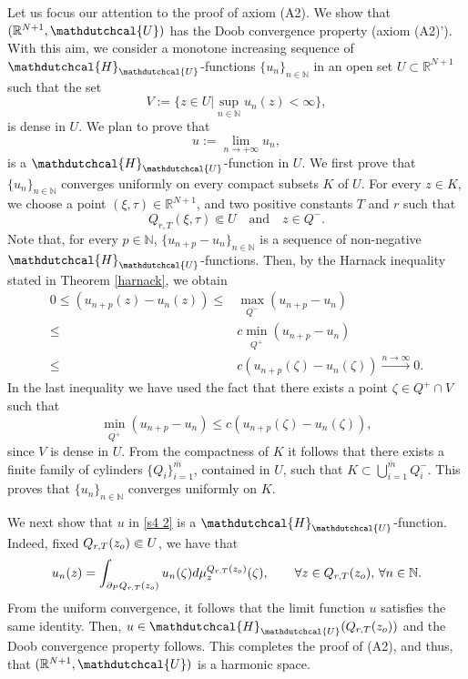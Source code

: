 \documentclass{amsart}
\numberwithin{equation}{section}
\def \R {{\mathbb {R}}}
\def \r{{\mathbb{R}}}
\def \Hd{{\mathdutchcal{H}}}
\def \Ud{{\mathdutchcal{U}}}
\begin{document}
{Let us focus our attention to the proof of  axiom {\rm (A2)}. We show that $(\r^{N+1},\Ud)$ has the Doob convergence property (axiom {\rm (A2)'}). With this aim, we consider a monotone increasing sequence of $\Hd_{\Ud}$-functions $\{u_n\}_{n \in \mathbb{N}}$ in an open set $U \subset \r^{N+1}$ such that the set
$$
V :=\biggl\{z \in U | \sup_{n \in \mathbb{N}}u_n(z) <\infty \biggr\},
$$
is dense in $U$. We plan to prove that 
\begin{equation}
	\label{s4 2}
u:= \lim_{n \rightarrow +\infty} u_n,
\end{equation}
is a $\Hd_{\Ud}$-function in $U$. We first prove that $\{u_n\}_{n \in \mathbb{N}}$ converges uniformly on every compact subsets $K$ of $U$. For every $z \in K$, we choose a point $(\xi, \tau) \in \R^{N+1}$, and two positive constants $T$ and $r$ such that
$$
{Q}_{r,T}(\xi, \tau) \Subset U \quad \mbox{and} \quad z \in Q^-.
$$
Note that, for every $p \in \mathbb{N}$, $\{u_{n+p}-u_n\}_{n \in \mathbb{N}}$ is a sequence of non-negative $\Hd_{\Ud}$-functions. Then, by the Harnack inequality stated in Theorem \ref{harnack}, we obtain
\begin{align*}
	0 \leq (u_{n+p}(z)-u_n(z)) \leq & \max_{\overline{Q^-}} (u_{n+p}-u_n)\\
	\leq & c \min_{\overline{Q^+}}(u_{n+p}-u_n)\\
	\leq & c (u_{n+p}(\zeta)-u_n(\zeta)) \xrightarrow{n \rightarrow \infty}0.
\end{align*}
In the last inequality we have used the fact that there exists a point $\zeta \in Q^+ \cap V$ such that 
$$
\min_{\overline{Q^+}}(u_{n+p}-u_n)
\leq  c (u_{n+p}(\zeta)-u_n(\zeta)),
$$ 
since $V$ is dense in $U$. From the compactness of $K$ it follows that there exists a finite family of cylinders $\{Q_i\}_{i=1}^{\bar{m}}$,  contained in $U$, such that $K \subset \bigcup_{i=1}^{\bar{m}} Q^-_i$. This proves that $\{u_n\}_{n \in \mathbb{N}}$ converges uniformly on $K$. 
 
We next show that $u$ in \eqref{s4 2} is a $\Hd_{\Ud}$-function. Indeed, fixed ${Q}_{r,T}(z_{\rm o}) \Subset U$, we have that 
\begin{equation*}
	u_n(z) = \int_{\partial_P {Q}_{r,T}(z_{\rm o})} u_n(\zeta) {\rm d}\mu^{{Q}_{r,T}(z_{\rm o})}_z(\zeta), \qquad \forall z \in {Q}_{r,T}(z_{\rm o}), \, \forall n \in \mathbb{N}.
\end{equation*}
From the uniform convergence, it follows that the limit function $u$ satisfies the same identity. Then, $u \in \Hd_{\Ud}({Q}_{r,T}(z_{\rm o}))$ and the Doob convergence property follows. This completes the proof of {\rm (A2)}, and thus, that $(\r^{N+1},\Ud)$ is a harmonic space. 

}
\end{document}
